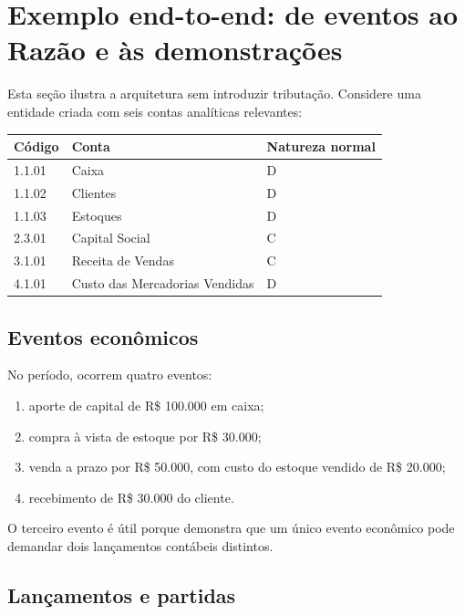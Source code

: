 \documentclass[11pt,a4paper]{article}
\begin{document}
\section{Exemplo end-to-end: de eventos ao Razão e às demonstrações}

Esta seção ilustra a arquitetura sem introduzir tributação. Considere uma entidade criada com seis contas analíticas relevantes:
\begin{center}
\begin{tabular}{lll}
\toprule
Código & Conta & Natureza normal\\
\midrule
1.1.01 & Caixa & D\\
1.1.02 & Clientes & D\\
1.1.03 & Estoques & D\\
2.3.01 & Capital Social & C\\
3.1.01 & Receita de Vendas & C\\
4.1.01 & Custo das Mercadorias Vendidas & D\\
\bottomrule
\end{tabular}
\end{center}

\subsection{Eventos econômicos}

No período, ocorrem quatro eventos:
\begin{enumerate}
    \item aporte de capital de R\$ 100.000 em caixa;
    \item compra à vista de estoque por R\$ 30.000;
    \item venda a prazo por R\$ 50.000, com custo do estoque vendido de R\$ 20.000;
    \item recebimento de R\$ 30.000 do cliente.
\end{enumerate}

O terceiro evento é útil porque demonstra que um único evento econômico pode demandar dois lançamentos contábeis distintos.

\subsection{Lançamentos e partidas}
\end{document}
